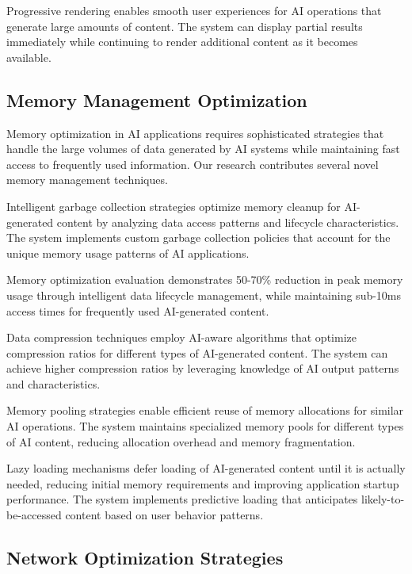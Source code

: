Progressive rendering enables smooth user experiences for AI operations that generate large amounts of content. The system can display partial results immediately while continuing to render additional content as it becomes available.

\subsection*{Memory Management Optimization}

Memory optimization in AI applications requires sophisticated strategies that handle the large volumes of data generated by AI systems while maintaining fast access to frequently used information. Our research contributes several novel memory management techniques.

Intelligent garbage collection strategies optimize memory cleanup for AI-generated content by analyzing data access patterns and lifecycle characteristics. The system implements custom garbage collection policies that account for the unique memory usage patterns of AI applications.

\begin{alertbox}
Memory optimization evaluation demonstrates 50-70\% reduction in peak memory usage through intelligent data lifecycle management, while maintaining sub-10ms access times for frequently used AI-generated content.
\end{alertbox}

Data compression techniques employ AI-aware algorithms that optimize compression ratios for different types of AI-generated content. The system can achieve higher compression ratios by leveraging knowledge of AI output patterns and characteristics.

Memory pooling strategies enable efficient reuse of memory allocations for similar AI operations. The system maintains specialized memory pools for different types of AI content, reducing allocation overhead and memory fragmentation.

Lazy loading mechanisms defer loading of AI-generated content until it is actually needed, reducing initial memory requirements and improving application startup performance. The system implements predictive loading that anticipates likely-to-be-accessed content based on user behavior patterns.

\subsection*{Network Optimization Strategies}

